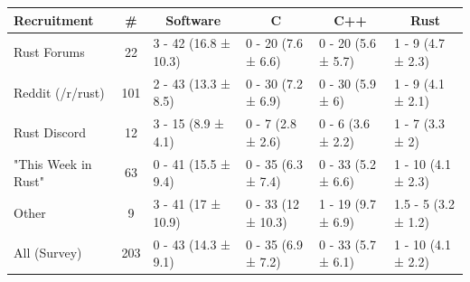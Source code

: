 \small
\begin{tabular}{|l|c|l|l|l|l|}
\hline
\textbf{Recruitment} & \textbf{\#} & \multicolumn{1}{c|}{\textbf{Software}} & \multicolumn{1}{c|}{\textbf{C}} & \multicolumn{1}{c|}{\textbf{C++}} & \multicolumn{1}{c|}{\textbf{Rust}} \\ \hline
Rust Forums          & 22          & 3 - 42 (16.8 ± 10.3)                   & 0 - 20 (7.6 ± 6.6)              & 0 - 20 (5.6 ± 5.7)                & 1 - 9 (4.7 ± 2.3)                  \\ \hline
Reddit (/r/rust)     & 101         & 2 - 43 (13.3 ± 8.5)                    & 0 - 30 (7.2 ± 6.9)              & 0 - 30 (5.9 ± 6)                  & 1 - 9 (4.1 ± 2.1)                  \\ \hline
Rust Discord         & 12          & 3 - 15 (8.9 ± 4.1)                     & 0 - 7 (2.8 ± 2.6)               & 0 - 6 (3.6 ± 2.2)                 & 1 - 7 (3.3 ± 2)                    \\ \hline
"This Week in Rust"  & 63          & 0 - 41 (15.5 ± 9.4)                    & 0 - 35 (6.3 ± 7.4)              & 0 - 33 (5.2 ± 6.6)                & 1 - 10 (4.1 ± 2.3)                 \\ \hline
Other                & 9           & 3 - 41 (17 ± 10.9)                     & 0 - 33 (12 ± 10.3)              & 1 - 19 (9.7 ± 6.9)                & 1.5 - 5 (3.2 ± 1.2)                \\ \hline
All (Survey)         & 203         & 0 - 43 (14.3 ± 9.1)                    & 0 - 35 (6.9 ± 7.2)              & 0 - 33 (5.7 ± 6.1)                & 1 - 10 (4.1 ± 2.2)                 \\ \hline
\end{tabular}